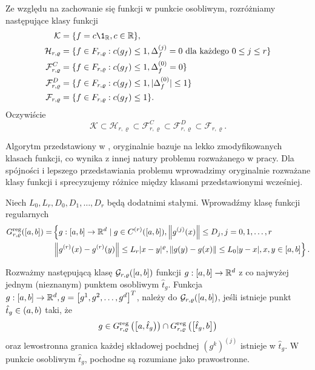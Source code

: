 \documentclass[oik, pdftex, robocza, man]{mgrwms}
\begin{document}
    Ze względu na zachowanie się funkcji w punkcie osobliwym, rozróżniamy następujące klasy funkcji
    \begin{equation*}
        \begin{split}
            \mathcal{K} & = \{f = c \1_{\R}, c \in \R \}, \\
            \mathcal{H}_{r, \varrho} & = \{ f \in F_{r, \varrho}: c(g_{f}) \leq 1, \Delta_{f}^{(j)} = 0 \text{ dla każdego } 0 \leq j \leq r\} \\
            \mathcal{F}_{r, \varrho}^{C} & = \{ f \in F_{r, \varrho}: c(g_{f}) \leq 1, \Delta_{f}^{(0)} = 0 \} \\
            \mathcal{F}_{r, \varrho}^{D} & = \{ f \in F_{r, \varrho}: c(g_{f}) \leq 1, | \Delta_{f}^{(0)} | \leq 1 \} \\
            \mathcal{F}_{r, \varrho} & = \{ f \in F_{r, \varrho}: c(g_{f}) \leq 1 \}. \\
        \end{split}
    \end{equation*}
    Oczywiście
    \begin{equation*}
        \mathcal{K} \subset \mathcal{H}_{r, \varrho} \subset \mathcal{F}_{r, \varrho}^{C} \subset \mathcal{F}_{r, \varrho}^{D} \subset \mathcal{F}_{r, \varrho}.
    \end{equation*}


    Algorytm przedstawiony w  \cite{CoDF}, oryginalnie bazuje na lekko zmodyfikowanych klasach funkcji, co wynika z innej natury problemu rozważanego w pracy. Dla spójności i lepszego przedstawiania problemu wprowadzimy oryginalnie rozważane klasy funkcji i sprecyzujemy różnice między klasami przedstawionymi wcześniej.

    Niech $L_{0}, L_{r}, D_{0}, D_{1}, \ldots, D_{r}$ będą dodatnimi stałymi. Wprowadźmy klasę funkcji regularnych
    \begin{equation*}
        \begin{aligned}
        G_{r, \varrho}^{\mathrm{reg}}([a, b])= &\left\{g:[a, b] \rightarrow \mathbb{R}^{d} \mid g \in C^{(r)}([a, b]),\left\|g^{(j)}(x)\right\| \leq D_{j}, j=0,1, \ldots, r\right. \\
                                      &\left.\left\|g^{(r)}(x)-g^{(r)}(y)\right\| \leq L_{r}|x-y|^{\varrho},\|g(y)-g(x)\| \leq L_{0}|y-x|, x,y \in [a, b]\right\}.
        \end{aligned}
    \end{equation*}

    Rozważmy następującą klasę $\mathcal{G}_{r,\varrho}([a, b])$ funkcji $g:[a, b] \rightarrow \mathbb{R}^{d}$ z co najwyżej jednym (nieznanym) punktem osobliwym $\hat{t}_{g}$. Funkcja $g:[a, b] \rightarrow \mathbb{R}^{d}, g=\left[g^{1}, g^{2}, \ldots, g^{d}\right]^{T}$, należy do $\mathcal{G}_{r,\varrho}([a, b])$, jeśli istnieje punkt $\hat{t}_{g} \in (a, b)$ taki, że 
    \begin{equation*}
        g \in G_{r, \varrho}^{\mathrm{reg}}\left(\left[a, \hat{t}_{g}\right)\right) \cap G_{r, \varrho}^{\mathrm{reg}}\left(\left[\hat{t}_{g}, b\right]\right)    
    \end{equation*}
    oraz lewostronna granica każdej składowej pochdnej $\left(g^{k}\right)^{(j)}$ istnieje w $\hat{t}_{g}$. W punkcie osobliwym $\hat{t}_{g}$, pochodne są rozumiane jako prawostronne.
    
\end{document}
